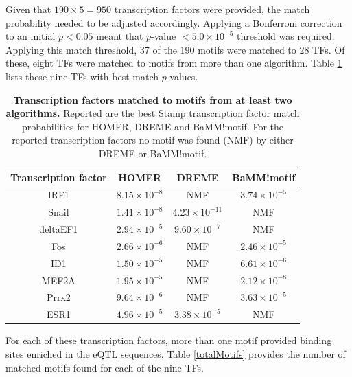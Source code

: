 \documentclass[12pt]{article}
\begin{document}
\newpage
Given that $190 \times 5 = 950$ transcription factors were provided, the match probability needed to be adjusted accordingly. Applying a Bonferroni correction to an initial $p < 0.05$ meant that $p$-value $< 5.0\times10^{-5}$ threshold was required. Applying this match threshold, 37 of the 190 motifs were matched to 28 TFs. Of these, eight TFs were matched to motifs from more than one algorithm.
Table \ref{tfsWithMotifs} lists these nine TFs with best match $p$-values.

\begin{table}[!htbp]
\caption{{\bf Transcription factors matched to motifs from at least two algorithms.} Reported are the best Stamp transcription factor match probabilities for HOMER, DREME and BaMM!motif. For the reported transcription factors no motif was found (NMF) by either DREME or BaMM!motif.}
\label{tfsWithMotifs}
\centering
\begin{tabular}{cccc}
\toprule[0.2em]
Transcription factor & HOMER & DREME & BaMM!motif\\
\midrule[0.1em]
IRF1             & $8.15\times10^{-8}$ & NMF & $3.74\times10^{-5}$\\
Snail             & $1.41\times10^{-8}$ & $4.23\times10^{-11}$ & NMF\\
deltaEF1      & $2.94\times10^{-5}$ & $9.60\times10^{-7}$ & NMF\\
Fos              & $2.66\times10^{-6}$ & NMF & $2.46\times10^{-5}$\\
ID1              & $1.50\times10^{-5}$ & NMF & $6.61\times10^{-6}$\\
MEF2A        & $1.95\times10^{-5}$ & NMF & $2.12\times10^{-8}$\\
Prrx2           & $9.64\times10^{-6}$ & NMF & $3.63\times10^{-5}$\\
ESR1         & $4.96\times10^{-5}$ & $3.38\times10^{-5}$ & NMF\\
\bottomrule[0.2em]
\end{tabular}
\end{table}

For each of these transcription factors, more than one motif provided binding sites enriched in the eQTL sequences. Table \ref{totalMotifs} provides the number of matched motifs found for each of the nine TFs.
\end{document}

